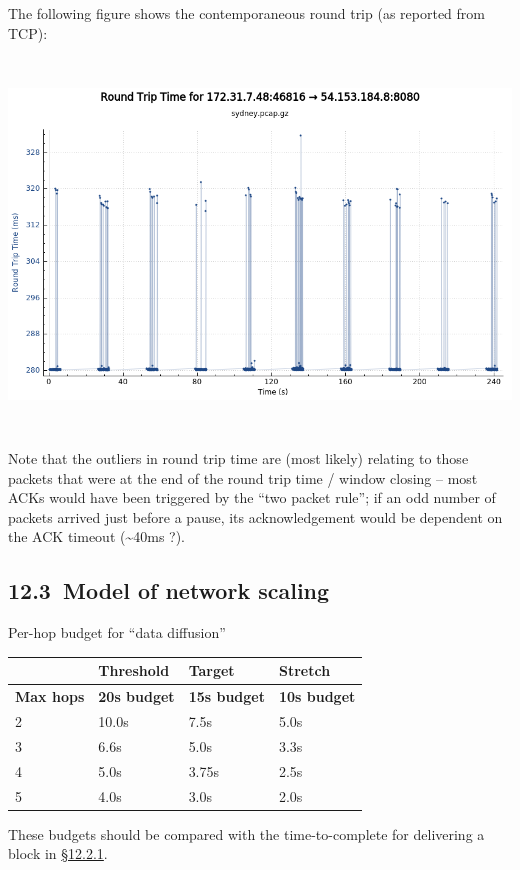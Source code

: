 \documentclass[11pt,a4paper]{article}
\begin{document}
The following figure shows the contemporaneous round trip (as reported
from TCP):

\includegraphics[width=6.27083in,height=3.88889in]{./media/image4.png}

Note that the outliers in round trip time are (most likely) relating to
those packets that were at the end of the round trip time / window
closing -- most ACKs would have been triggered by the ``two packet
rule''; if an odd number of packets arrived just before a pause, its
acknowledgement would be dependent on the ACK timeout
(\textasciitilde{}40ms ?).

\hypertarget{model-of-network-scaling}{%
\subsection{​12.3​~Model of network
scaling}\label{model-of-network-scaling}}

Per-hop budget for ``data diffusion''

\begin{longtable}[]{@{}llll@{}}
\toprule
& Threshold & Target & Stretch\tabularnewline
\midrule
\endhead
\textbf{Max hops} & \textbf{20s budget} & \textbf{15s budget} &
\textbf{10s budget}\tabularnewline
2 & 10.0s & 7.5s & 5.0s\tabularnewline
3 & 6.6s & 5.0s & 3.3s\tabularnewline
4 & 5.0s & 3.75s & 2.5s\tabularnewline
5 & 4.0s & 3.0s & 2.0s\tabularnewline
\bottomrule
\end{longtable}

These budgets should be compared with the time-to-complete for
delivering a block in
\protect\hyperlink{time-to-transmit-a-block-of-given-size-across-given-latencies}{{§12.2.1}}.
\end{document}
